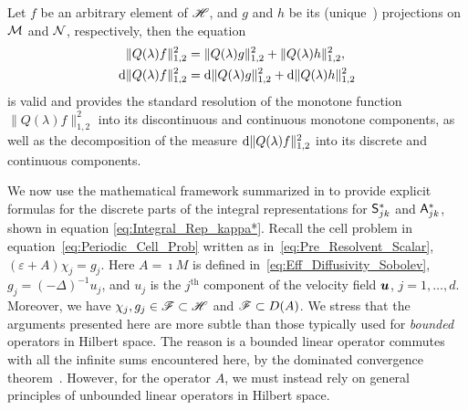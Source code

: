 \documentclass[amsa]{ipart}
\begin{document}
\begin{theorem}
Let $f$ be an arbitrary element of $\mathscr{H}$, and $g$ and $h$ be its
(unique~\cite{Folland:99:RealAnalysis}) 
projections on $\mathcal{M}$ and $\mathcal{N}$, respectively, then the equation
%
\begin{align}\label{eq:Disc_Cont_Measures}
  \|Q(\lambda)f\|_{1,2}^2&=\|Q(\lambda)g\|_{1,2}^2+\|Q(\lambda)h\|_{1,2}^2,
  \\
  \d\|Q(\lambda)f\|_{1,2}^2&=\d\|Q(\lambda)g\|_{1,2}^2+\d\|Q(\lambda)h\|_{1,2}^2
  \notag
\end{align}
%
is valid and provides the standard resolution of the monotone function
$\|Q(\lambda)f\|_{1,2}^2$ into its discontinuous and continuous monotone
components, as well as the decomposition of the measure
$\mathrm{d}\|Q(\lambda)f\|_{1,2}^2$ into its discrete and continuous components.  
\end{theorem}
%






We now use the mathematical framework summarized in
 to provide explicit formulas for the
discrete parts of the integral representations for $\mathsf{S}^*_{jk}$
and $\mathsf{A}^*_{jk}$, shown in equation
\eqref{eq:Integral_Rep_kappa*}. Recall the cell problem
in equation~\eqref{eq:Periodic_Cell_Prob} written as
in~\eqref{eq:Pre_Resolvent_Scalar}, $(\varepsilon+A)\chi_j=g_j$. Here $A=\imath M$ 
is defined in~\eqref{eq:Eff_Diffusivity_Sobolev}, $g_j=(-\Delta)^{-1}u_j$,
and $u_j$ is the $j^{\text{th}}$ component of the velocity field
$\boldsymbol{u}$, $j=1,\ldots,d$. Moreover, we have $\chi_j,g_j\in\mathscr{F}\subset\mathscr{H}$ and $\mathscr{F}\subset
D(A)$. We stress that the arguments presented here are more subtle
than those typically used for \emph{bounded} operators in Hilbert
space. The reason is a bounded linear operator commutes with all
the infinite sums encountered here, by the dominated convergence
theorem~\cite{Folland:99:RealAnalysis}. However, for the operator $A$,
we must instead rely on general principles of unbounded linear operators in
Hilbert space.  
\end{document}
